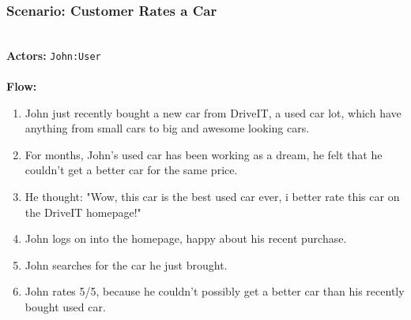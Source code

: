 \subsubsection{Scenario: Customer Rates a Car}
\HRule \\[0.4cm]
\textbf{Actors:} \texttt{John:User}\\
\HRule \\[0.4cm]
\textbf{Flow:} \\
\begin{enumerate}
\item John just recently bought a new car from DriveIT, a used car lot, which have anything from small cars to big and awesome looking cars.
\item For months, John's used car has been working as a dream, he felt that he couldn't get a better car for the same price.
\item He thought: "Wow, this car is the best used car ever, i better rate this car on the DriveIT homepage!"
\item John logs on into the homepage, happy about his recent purchase.
\item John searches for the car he just brought.
\item John rates 5/5, because he couldn't possibly get a better car than his recently bought used car.
\end{enumerate}
\HRule \\[0.4cm]